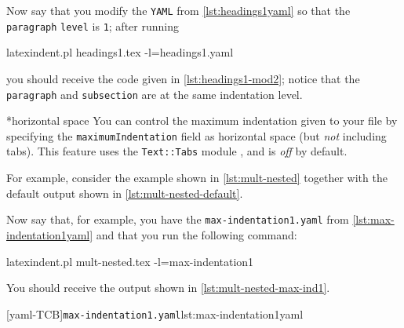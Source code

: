 	Now say that you modify the \texttt{YAML} from \cref{lst:headings1yaml} so that the
	\texttt{paragraph} \texttt{level} is \texttt{1}; after running 
	\begin{commandshell}
latexindent.pl headings1.tex -l=headings1.yaml
\end{commandshell}
	you should receive the code given in \cref{lst:headings1-mod2}; notice that the
	\texttt{paragraph} and \texttt{subsection} are at the same indentation level.


*{horizontal space}
	You can control the maximum indentation given to your file by
	 specifying the \texttt{maximumIndentation}
	field as horizontal space (but \emph{not} including tabs). This feature uses the
	\texttt{Text::Tabs} module \cite{texttabs}, and is \emph{off} by default.%

	For example, consider the example shown in \cref{lst:mult-nested} together with the
	default output shown in \cref{lst:mult-nested-default}.

	\begin{cmhtcbraster}[raster column skip=.1\linewidth]
	\end{cmhtcbraster}

	Now say that, for example, you have the \texttt{max-indentation1.yaml} from
	\cref{lst:max-indentation1yaml} and that you run the following command:
	\begin{commandshell}
latexindent.pl mult-nested.tex -l=max-indentation1
\end{commandshell}
	You should receive the output shown in \cref{lst:mult-nested-max-ind1}.

	\begin{cmhtcbraster}
		[yaml-TCB]{\texttt{max-indentation1.yaml}}{lst:max-indentation1yaml}
	\end{cmhtcbraster}

